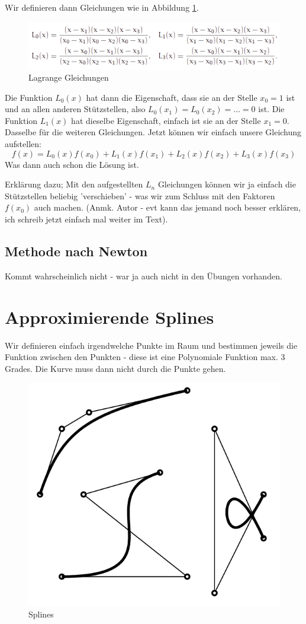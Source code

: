 Wir definieren dann Gleichungen wie in Abbildung \ref{fig:lagrange_gleichungen}.
\begin{figure}[!ht]
	\centering
	\includegraphics[width=0.7\linewidth]{fig/lagrange_gleichungen}
	\caption{Lagrange Gleichungen}
	\label{fig:lagrange_gleichungen}
\end{figure}
Die Funktion \(L_0(x)\) hat dann die Eigenschaft, dass sie an der Stelle \(x_0 = 1\) ist und an allen anderen Stützstellen, also \(L_0(x_1) = L_0(x_2) = \dots = 0\)  ist. Die Funktion \(L_1(x)\) hat dieselbe Eigenschaft, einfach ist sie an der Stelle \(x_1 = 0\). Dasselbe für die weiteren Gleichungen. Jetzt können wir einfach unsere Gleichung aufstellen:
\begin{displaymath}
f(x) = L_0(x)f(x_0) + L_1(x)f(x_1) + L_2(x)f(x_2)+ L_3(x)f(x_3)
\end{displaymath}
Was dann auch schon die Lösung ist.

Erklärung dazu; Mit den aufgestellten \(L_n\) Gleichungen können wir ja einfach die Stützstellen beliebig 'verschieben' - was wir zum Schluss mit den Faktoren \(f(x_0)\) auch machen. (Anmk. Autor - evt kann das jemand noch besser erklären, ich schreib jetzt einfach mal weiter im Text).
\subsection{Methode nach Newton}
Kommt wahrscheinlich nicht - war ja auch nicht in den Übungen vorhanden.
\section{Approximierende Splines}
Wir definieren einfach irgendwelche Punkte im Raum und bestimmen jeweils die Funktion zwischen den Punkten - diese ist eine Polynomiale Funktion max. 3 Grades. Die Kurve muss dann nicht durch die Punkte gehen.

\begin{figure}[!ht]
	\centering
	\includegraphics[width=0.3\linewidth]{fig/splines}
	\caption{Splines}
	\label{fig:splines}
\end{figure}

